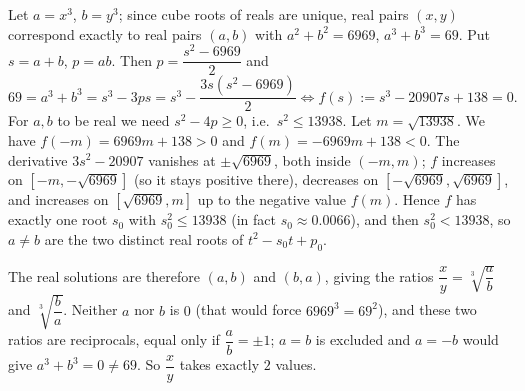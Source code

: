 Let $a=x^3$, $b=y^3$; since cube roots of reals are unique, real pairs $(x,y)$ correspond exactly to real pairs $(a,b)$ with $a^2+b^2=6969$, $a^3+b^3=69$. Put $s=a+b$, $p=ab$. Then $p=\dfrac{s^2-6969}{2}$ and
\[
69=a^3+b^3=s^3-3ps=s^3-\dfrac{3s(s^2-6969)}{2}\iff f(s):=s^3-20907s+138=0 .
\]
For $a,b$ to be real we need $s^2-4p\ge0$, i.e.\ $s^2\le13938$. Let $m=\sqrt{13938}$. We have $f(-m)=6969m+138>0$ and $f(m)=-6969m+138<0$. The derivative $3s^2-20907$ vanishes at $\pm\sqrt{6969}$, both inside $(-m,m)$; $f$ increases on $[-m,-\sqrt{6969}]$ (so it stays positive there), decreases on $[-\sqrt{6969},\sqrt{6969}]$, and increases on $[\sqrt{6969},m]$ up to the negative value $f(m)$. Hence $f$ has exactly one root $s_0$ with $s_0^2\le13938$ (in fact $s_0\approx0.0066$), and then $s_0^2<13938$, so $a\ne b$ are the two distinct real roots of $t^2-s_0t+p_0$.

The real solutions are therefore $(a,b)$ and $(b,a)$, giving the ratios $\dfrac {x}{y}=\sqrt[3]{\dfrac {a}{b}}$ and $\sqrt[3]{\dfrac {b}{a}}$. Neither $a$ nor $b$ is $0$ (that would force $6969^{3}=69^2$), and these two ratios are reciprocals, equal only if $\dfrac {a}{b}=\pm1$; $a=b$ is excluded and $a=-b$ would give $a^3+b^3=0\ne69$. So $\dfrac {x}{y}$ takes exactly $\boxed{2}$ values.
